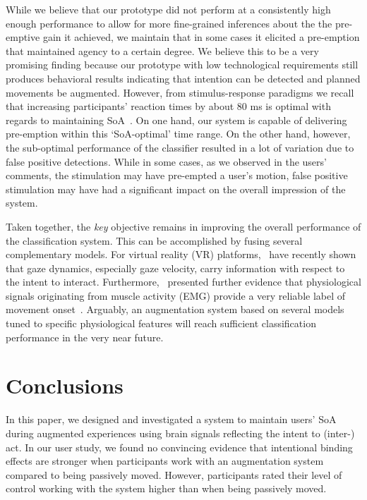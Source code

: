 While we believe that our prototype did not perform at a consistently high enough performance to allow for more fine-grained inferences about the the pre-emptive gain it achieved, we maintain that in some cases it elicited a pre-emption that maintained agency to a certain degree. We believe this to be a very promising finding because our prototype with low technological requirements still produces behavioral results indicating that intention can be detected and planned movements be augmented. However, from stimulus-response paradigms we recall that increasing participants' reaction times by about 80 ms is optimal with regards to maintaining SoA~\cite{Kasahara2019-sk}. On one hand, our system is capable of delivering pre-emption within this `SoA-optimal' time range. On the other hand, however, the sub-optimal performance of the classifier resulted in a lot of variation due to false positive detections. While in some cases, as we observed in the users' comments, the stimulation may have pre-empted a user's motion, false positive stimulation may have had a significant impact on the overall impression of the system.

Taken together, the \textit{key} objective remains in improving the overall performance of the classification system. This can be accomplished by fusing several complementary models. For virtual reality (VR) platforms,~\citet{David-John2021-vg} have recently shown that gaze dynamics, especially gaze velocity, carry information with respect to the intent to interact. Furthermore,~\citet{Nguyen2023-me} presented further evidence that physiological signals originating from muscle activity (EMG) provide a very reliable label of movement onset~\cite{Nguyen2023-me}. Arguably, an augmentation system based on several models tuned to specific physiological features will reach sufficient classification performance in the very near future.


\section{Conclusions}
In this paper, we designed and investigated a system to maintain users' SoA during augmented experiences using brain signals reflecting the intent to (inter-) act. In our user study, we found no convincing evidence that intentional binding effects are stronger when participants work with an augmentation system compared to being passively moved. However, participants rated their level of control working with the system higher than when being passively moved.

